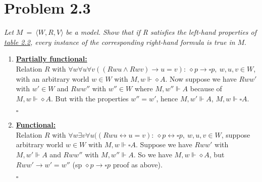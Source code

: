 \documentclass{report}
\begin{document}
	\section*{Problem 2.3}
		\textit{Let } $M \ = \ \langle W,R,V \rangle$ \textit{be a model. Show that if R satisfies the left-hand properties of \underline{table 2.2}, every instance of the corresponding right-hand formula is true in} $M$.
		\begin{enumerate}[]
			\item \underline{\textbf{Partially functional:}} \\
				Relation $R$ with $\forall w \forall u \forall v ((Rwu \wedge Rwv) \rightarrow u = v): \ \diamond p \rightarrow \square p, \ w,u,v \in W$, with an arbitrary world $w \in W$ with $M,w \Vdash \diamond A$. Now suppose we have $Rww'$ with $w' \in W$ and $Rww''$ with $w'' \in W$ where $M,w'' \Vdash A$ because of $M, w \Vdash \diamond A$. But with the properties $w'' = w'$, hence $M,w' \Vdash A$, $M,w \Vdash \square A$.
				\begin{flushright}
						$\square$
				\end{flushright}
			\item \underline{\textbf{Functional:}} \\
				Relation $R$ with $\forall w \exists v \forall u ((Rwu \leftrightarrow u = v): \ \diamond p \leftrightarrow \square p, \ w,u,v \in W$, suppose arbitrary world $w \in W$  with $M, w \Vdash \square A$. Suppose we have $Rww'$ with $M,w' \Vdash A$ and $Rww''$ with $M,w'' \Vdash A$. So we have $M,w \Vdash \diamond A$, but $Rww' \rightarrow w' = w''$ (sp $\diamond p \rightarrow \square p$ proof as above).
				\begin{flushright}
						$\square$
				\end{flushright}
		\end{enumerate}
\end{document}
